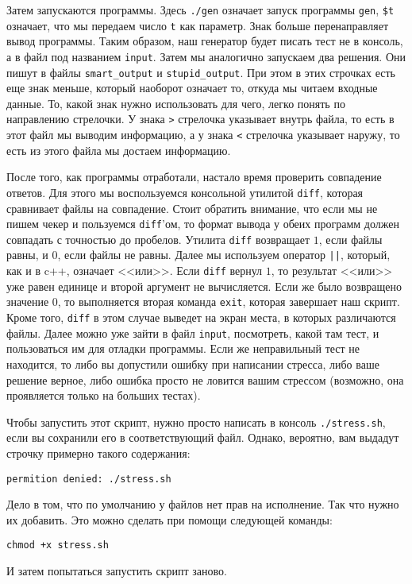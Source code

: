 Затем запускаются программы. Здесь \verb+./gen+ означает запуск программы \verb+gen+, \verb+$t+ означает, что мы передаем число \verb+t+ как параметр. Знак больше перенаправляет вывод программы. Таким образом, наш генератор будет писать тест не в консоль, а в файл под названием \verb+input+. Затем мы аналогично запускаем два решения. Они пишут в файлы \verb+smart_output+ и \verb+stupid_output+. При этом в этих строчках есть еще знак меньше, который наоборот означает то, откуда мы читаем входные данные. То, какой знак нужно использовать для чего, легко понять по направлению стрелочки. У знака \verb+>+ стрелочка указывает внутрь файла, то есть в этот файл мы выводим информацию, а у знака \verb+<+ стрелочка указывает наружу, то есть из этого файла мы достаем информацию.

После того, как программы отработали, настало время проверить совпадение ответов. Для этого мы воспользуемся консольной утилитой \verb+diff+, которая сравнивает файлы на совпадение. Стоит обратить внимание, что если мы не пишем чекер и пользуемся \verb+diff+'ом, то формат вывода у обеих программ должен совпадать с точностью до пробелов. Утилита \verb+diff+ возвращает $1$, если файлы равны, и $0$, если файлы не равны. Далее мы используем оператор \verb+||+, который, как и в c++, означает <<или>>. Если \verb+diff+ вернул $1$, то результат <<или>> уже равен единице и второй аргумент не вычисляется. Если же было возвращено значение $0$, то выполняется вторая команда \verb+exit+, которая завершает наш скрипт. Кроме того, \verb+diff+ в этом случае выведет на экран места, в которых различаются файлы. Далее можно уже зайти в файл \verb+input+, посмотреть, какой там тест, и пользоваться им для отладки программы. Если же неправильный тест не находится, то либо вы допустили ошибку при написании стресса, либо ваше решение верное, либо ошибка просто не ловится вашим стрессом (возможно, она проявляется только на больших тестах).

Чтобы запустить этот скрипт, нужно просто написать в консоль \verb+./stress.sh+, если вы сохранили его в соответствующий файл. Однако, вероятно, вам выдадут строчку примерно такого содержания:

\verb+permition denied: ./stress.sh+

Дело в том, что по умолчанию у файлов нет прав на исполнение. Так что нужно их добавить. Это можно сделать при помощи следующей команды:

\verb^chmod +x stress.sh^

И  затем попытаться запустить скрипт заново.


